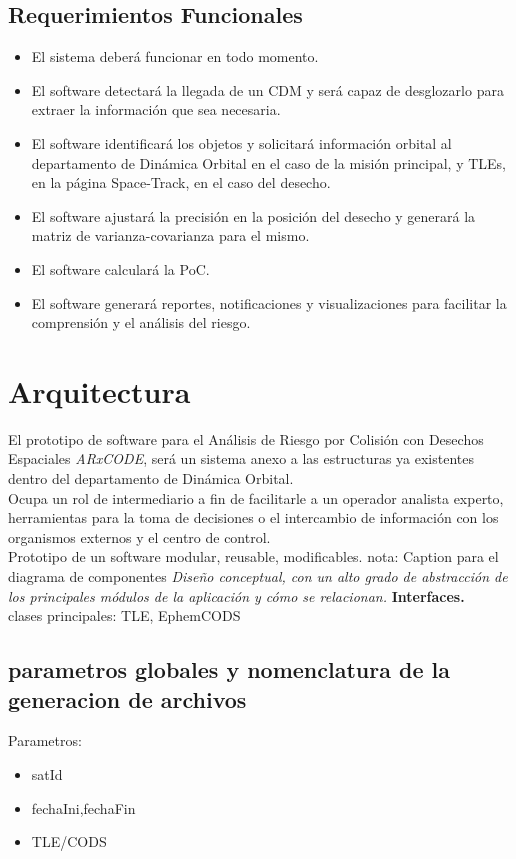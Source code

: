 \subsection*{Requerimientos Funcionales}
\begin{itemize}
\item El sistema deber\'a funcionar en todo momento.\\
\item El software detectar\'a la llegada de un CDM y ser\'a capaz de desglozarlo para extraer la informaci\'on que sea necesaria.\\
\item El software identificar\'a los objetos y solicitar\'a informaci\'on orbital al departamento de Din\'amica Orbital en el caso de la misi\'on principal, y TLEs, en la p\'agina Space-Track, en el caso del desecho.\\
\item El software ajustar\'a la precisi\'on en la posici\'on del desecho y generar\'a la matriz de varianza-covarianza para el mismo.\\
\item El software calcular\'a la PoC.\\
\item El software generar\'a reportes, notificaciones y visualizaciones para facilitar la comprensi\'on y el an\'alisis del riesgo.
\end{itemize}


\section{Arquitectura}
El prototipo de software para el An\'alisis de Riesgo por Colisi\'on con Desechos Espaciales {\it{ARxCODE}}, ser\'a un sistema anexo a las estructuras ya existentes dentro del departamento de Din\'amica Orbital.\\
Ocupa un rol de intermediario a fin de facilitarle a un operador analista experto, herramientas para la toma de decisiones o el intercambio de informaci\'on con los organismos externos y el centro de control.\\
Prototipo de un software modular, reusable, modificables. 
nota: Caption para el diagrama de componentes {\it{Dise\~no conceptual, con un alto grado de abstracci\'on de los principales m\'odulos de la aplicaci\'on y c\'omo se relacionan.}}
{\bf{Interfaces.}}\\
clases principales: TLE, EphemCODS
\subsection*{parametros globales y nomenclatura de la generacion de archivos}
Parametros:\\
\begin{itemize}
 \item satId
 \item fechaIni,fechaFin
 \item TLE/CODS
\end{itemize}

